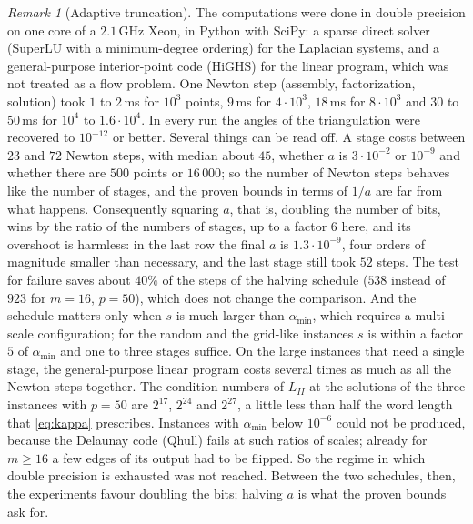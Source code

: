 \documentclass[11pt]{amsart}
\theoremstyle{definition}
\theoremstyle{remark}
\newtheorem{remark}[theorem]{Remark}
\begin{document}
\begin{remark}[Adaptive truncation]
\noindent The computations were done in double precision on one core of a $2.1$\,GHz Xeon, in Python with SciPy: a sparse direct solver (SuperLU with a minimum-degree ordering) for the Laplacian systems, and a general-purpose interior-point code (HiGHS) for the linear program, which was not treated as a flow problem. One Newton step (assembly, factorization, solution) took $1$ to $2$\,ms for $10^3$ points, $9$\,ms for $4\cdot10^3$, $18$\,ms for $8\cdot10^3$ and $30$ to $50$\,ms for $10^4$ to $1.6\cdot10^4$. In every run the angles of the triangulation were recovered to $10^{-12}$ or better.
Several things can be read off. A stage costs between $23$ and $72$ Newton steps, with median about $45$, whether $a$ is $3\cdot10^{-2}$ or $10^{-9}$ and whether there are $500$ points or $16\,000$; so the number of Newton steps behaves like the number of stages, and the proven bounds in terms of $1/a$ are far from what happens.
Consequently squaring $a$, that is, doubling the number of bits, wins by the ratio of the numbers of stages, up to a factor $6$ here, and its overshoot is harmless: in the last row the final $a$ is $1.3\cdot10^{-9}$, four orders of magnitude smaller than necessary, and the last stage still took $52$ steps.
The test for failure saves about $40\%$ of the steps of the halving schedule ($538$ instead of $923$ for $m=16$, $p=50$), which does not change the comparison. And the schedule matters only when $s$ is much larger than $\alpha_{\min}$, which requires a multi-scale configuration; for the random and the grid-like instances $s$ is within a factor $5$ of $\alpha_{\min}$ and one to three stages suffice.
On the large instances that need a single stage, the general-purpose linear program costs several times as much as all the Newton steps together. The condition numbers of $L_{II}$ at the solutions of the three instances with $p=50$ are $2^{17}$, $2^{24}$ and $2^{27}$, a little less than half the word length that \eqref{eq:kappa} prescribes.
Instances with $\alpha_{\min}$ below $10^{-6}$ could not be produced, because the Delaunay code (Qhull) fails at such ratios of scales; already for $m\ge16$ a few edges of its output had to be flipped. So the regime in which double precision is exhausted was not reached.
Between the two schedules, then, the experiments favour doubling the bits; halving $a$ is what the proven bounds ask for.


\end{remark}
\end{document}
